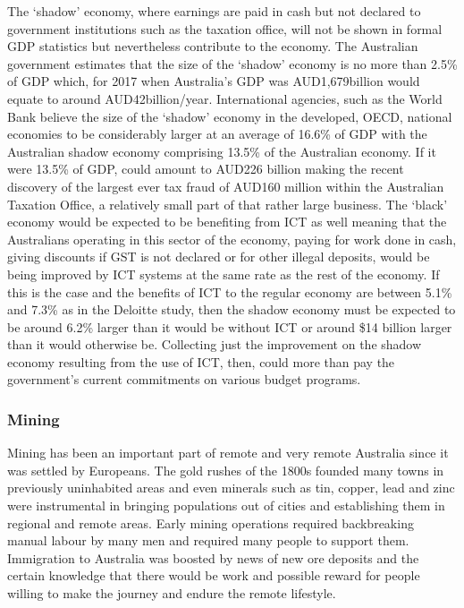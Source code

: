 The `shadow' economy, where earnings are paid in cash but not declared to government institutions such as the taxation office, will not be shown in formal GDP statistics but nevertheless contribute to the economy. The Australian government estimates that the size of the `shadow' economy is no more than 2.5\% of GDP which, for 2017 when Australia's GDP was AUD1,679billion\cite{ABS1345}  would equate to around AUD42billion/year. International agencies, such as the World Bank believe the size of the `shadow' economy in the developed, OECD, national economies to be considerably larger at an average of 16.6\% of GDP with the Australian shadow economy comprising 13.5\% of the Australian economy\cite[p24]{WB2010}. If it were 13.5\% of GDP, could amount to AUD226 billion making the recent discovery of the largest ever tax fraud of AUD160 million within the Australian Taxation Office, a relatively small part of that rather large business.  The `black' economy would be expected to be benefiting from ICT as well meaning that the Australians operating in this sector of the economy, paying for work done in cash, giving discounts if GST is not declared or for other illegal deposits, would be being improved by ICT systems at the same rate as the rest of the economy. If this is the case and the benefits of ICT to the regular economy are between 5.1\% and 7.3\% as in the Deloitte study, then the shadow economy must be expected to be around 6.2\% larger than it would be without ICT or around \$14 billion larger than it would otherwise be. Collecting just the improvement on the shadow economy resulting from the use of ICT, then, could more than pay the government's current commitments on various budget programs. 

\subsubsection{Mining}
Mining has been an important part of remote and very remote Australia since it was settled by Europeans. The gold rushes of the 1800s founded many towns in previously uninhabited areas and even minerals such as tin, copper, lead and zinc were instrumental in bringing populations out of cities and establishing them in regional and remote areas. Early mining operations required backbreaking manual labour by many men and required many people to support them. Immigration to Australia was boosted by news of new ore deposits and the certain knowledge that there would be work and possible reward for people willing to make the journey and endure the remote lifestyle.

